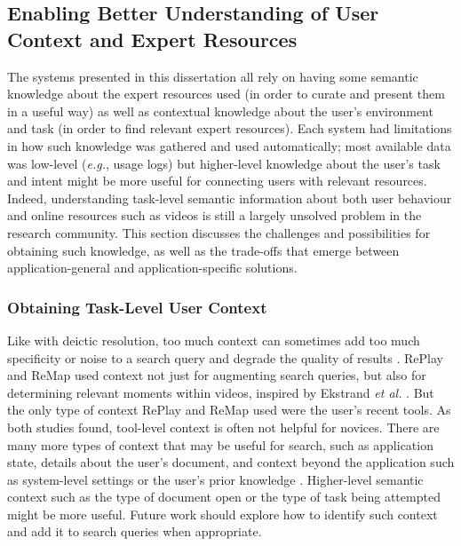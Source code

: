 \subsection{Enabling Better Understanding of User Context and Expert Resources}
The systems presented in this dissertation all rely on having some semantic knowledge about the expert resources used (in order to curate and present them in a useful way) as well as contextual knowledge about the user's environment and task (in order to find relevant expert resources). Each system had limitations in how such knowledge was gathered and used automatically; most available data was low-level (\textit{e.g.}, usage logs) but higher-level knowledge about the user's task and intent might be more useful for connecting users with relevant resources. Indeed, understanding task-level semantic information about both user behaviour and online resources such as videos is still a largely unsolved problem in the research community. This section discusses the challenges and possibilities for obtaining such knowledge, as well as the trade-offs that emerge between application-general and application-specific solutions.

\subsubsection{Obtaining Task-Level User Context}
Like with deictic resolution, too much context can sometimes add too much specificity or noise to a search query and degrade the quality of results \cite{Finkelstein2002, Ekstrand2011}. RePlay and ReMap used context not just for augmenting search queries, but also for determining relevant moments within videos, inspired by Ekstrand \textit{et al.} \cite{Ekstrand2011}. But the only type of context RePlay and ReMap used were the user's recent tools. As both studies found, tool-level context is often not helpful for novices. There are many more types of context that may be useful for search, such as application state, details about the user's document, and context beyond the application such as system-level settings or the user's prior knowledge \cite{Ekstrand2011}. Higher-level semantic context such as the type of document open or the type of task being attempted might be more useful. Future work should explore how to identify such context and add it to search queries when appropriate. 

